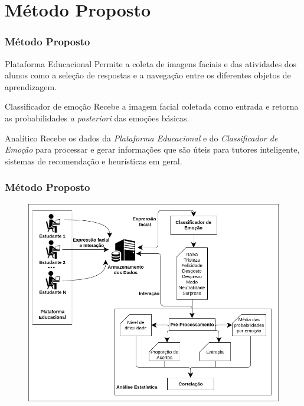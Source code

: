 \documentclass{beamer}
\begin{document}
\section{M\'etodo Proposto}
\begin{frame}
\frametitle{M\'etodo Proposto}
\pause
\begin{block}{Plataforma Educacional}
Permite a coleta de imagens faciais e das atividades dos alunos como a sele\c{c}\~ao de 
respostas e a navega\c{c}\~ao entre os diferentes objetos de aprendizagem.
\end{block}
\pause
\begin{block}{Classificador de emo\c{c}\~ao}
Recebe a imagem facial coletada como entrada e retorna as probabilidades \textit{a posteriori} das emo\c{c}\~oes b\'asicas.
\end{block}
\pause
\begin{block}{Anal\'{i}tico}
Recebe os dados da \textit{Plataforma Educacional} e do \textit{Classificador de Emo\c{c}\~ao} para processar e gerar informa\c{c}\~oes que s\~{a}o 
\'{u}teis para tutores inteligente, sistemas de recomenda\c{c}\~ao e heur\'isticas em geral.    
\end{block}

\end{frame}



\begin{frame}
\frametitle{M\'etodo Proposto}
\begin{figure}
\centering
\includegraphics[scale=0.35]{figuras/diagrama.png}
\end{figure}
\end{frame}
\end{document}
